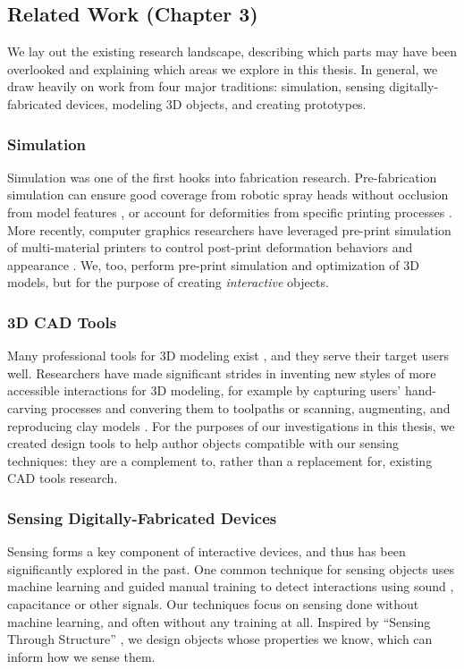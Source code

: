 \subsection{Related Work (Chapter 3)}

We lay out the existing research landscape, describing which parts may have been overlooked and explaining which areas we explore in this thesis. In general, we draw heavily on work from four major traditions: simulation, sensing digitally-fabricated devices, modeling 3D objects, and creating prototypes.

\subsubsection{Simulation}
Simulation was one of the first hooks into fabrication research. Pre-fabrication simulation can ensure good coverage from robotic spray heads without occlusion from model features \cite{gursoz-noodles}, or account for deformities from specific printing processes \cite{hsu-numerical}. More recently, computer graphics researchers have leveraged pre-print simulation of multi-material printers to control post-print deformation behaviors \cite{bickel-deformation} and appearance \cite{lan-appearance}. We, too, perform pre-print simulation and optimization of 3D models, but for the purpose of creating \emph{interactive} objects.

\subsubsection{3D CAD Tools}
Many professional tools for 3D modeling exist \cite{solidworks, rhino}, and they serve their target users well. Researchers have made significant strides in inventing new styles of more accessible interactions for 3D modeling, for example by capturing users' hand-carving processes and convering them to toolpaths \cite{willis-interactive} or scanning, augmenting, and reproducing clay models \cite{savage-mmarks}. For the purposes of our investigations in this thesis, we created design tools to help author objects compatible with our sensing techniques: they are a complement to, rather than a replacement for, existing CAD tools research.

\subsubsection{Sensing Digitally-Fabricated Devices}
Sensing forms a key component of interactive devices, and thus has been significantly explored in the past. One common technique for sensing objects uses machine learning and guided manual training to detect interactions using sound \cite{ono-touchandactivate,laput-acoustruments}, capacitance \cite{sato-touche} or other signals. Our techniques focus on sensing done without machine learning, and often without any training at all. Inspired by ``Sensing Through Structure'' \cite{slyper-structure}, we design objects whose properties we know, which can inform how we sense them.

